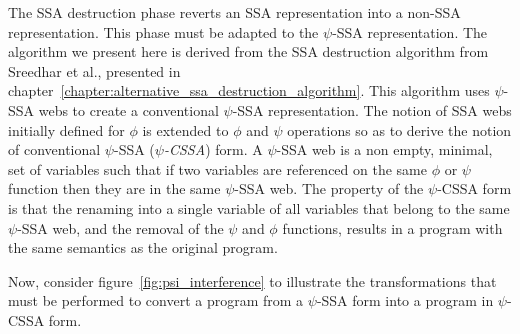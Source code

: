 The SSA destruction phase reverts an SSA representation into a non-SSA
representation. This phase must be adapted to the $\psi$-SSA
representation. The algorithm we present here is derived from the SSA
destruction algorithm from Sreedhar et al., presented in
chapter~\ref{chapter:alternative_ssa_destruction_algorithm}. This algorithm uses
$\psi$-SSA webs to create a conventional $\psi$-SSA
representation. The notion of SSA webs initially defined for $\phi$ is
extended to $\phi$ and $\psi$ operations so as to derive the notion of
conventional $\psi$-SSA ({\em $\psi$-CSSA}) form. A $\psi$-SSA web is
a non empty, minimal, set of variables such that if two variables are
referenced on the same $\phi$ or $\psi$ function then they are in the
same $\psi$-SSA web. The property of the $\psi$-CSSA form is that the
renaming into a single variable of all variables that belong to the
same $\psi$-SSA web, and the removal of the $\psi$ and $\phi$
functions, results in a program with the same semantics as the
original program.


Now, consider figure~\ref{fig:psi_interference} to illustrate the
transformations that must be performed to convert a program from a
$\psi$-SSA form into a program in $\psi$-CSSA form.

